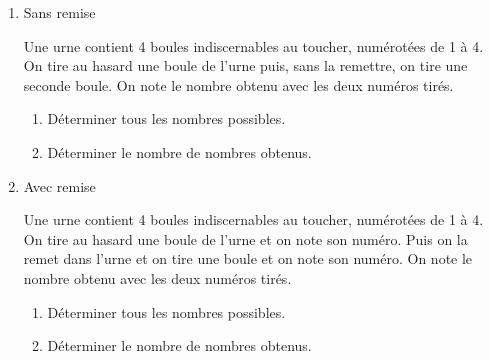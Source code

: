 
\begin{enumerate}
\item Sans remise

 Une urne contient 4 boules indiscernables au toucher, numérotées de 1 à 4. On tire au hasard une boule
de l'urne puis, sans la remettre, on tire une seconde boule. On note le nombre obtenu avec les deux
numéros tirés.
\begin{enumerate}
\item Déterminer tous les nombres possibles.
\item Déterminer le nombre de nombres obtenus.
\end{enumerate}

\item Avec remise

Une urne contient 4 boules indiscernables au toucher, numérotées de 1 à 4. On tire au hasard une boule
de l'urne et on note son numéro. Puis on la remet dans l'urne et on tire une boule et on note son
numéro. On note le nombre obtenu avec les deux numéros tirés.
\begin{enumerate}
\item Déterminer tous les nombres possibles.
\item Déterminer le nombre de nombres obtenus.
\end{enumerate}
\end{enumerate}